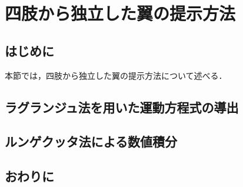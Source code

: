 \chapter[四肢から独立した翼の提示方法]%
        {四肢から独立した翼の提示方法}

\section{はじめに}
    本節では，四肢から独立した翼の提示方法について述べる．
    
\section{ラグランジュ法を用いた運動方程式の導出}
\section{ルンゲクッタ法による数値積分}
\section{おわりに}